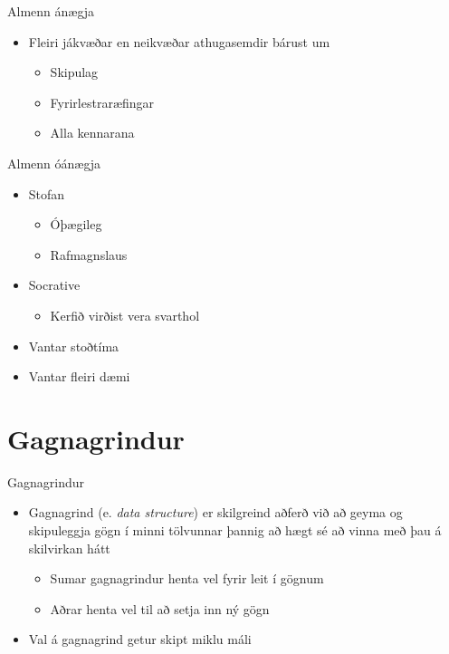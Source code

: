 \documentclass[handout]{beamer}
\begin{document}
\begin{frame}{Almenn ánægja}
\begin{itemize}
 \item Fleiri jákvæðar en neikvæðar athugasemdir bárust um
 \begin{itemize}[<+->]
  \item Skipulag
  \item Fyrirlestraræfingar
  \item Alla kennarana
 \end{itemize}
\end{itemize}
\end{frame}

\begin{frame}{Almenn óánægja}
\begin{itemize}
 \item Stofan
 \begin{itemize}
  \item Óþægileg
  \item Rafmagnslaus \pause
 \end{itemize}
 \item Socrative
 \begin{itemize}
  \item Kerfið virðist vera svarthol \pause
 \end{itemize}
 \item Vantar stoðtíma \pause 
 \item Vantar fleiri dæmi
\end{itemize}
\end{frame}

\section{Gagnagrindur}

\begin{frame}{Gagnagrindur}
\begin{itemize}
 \item Gagnagrind (e. \emph{data structure}) er skilgreind aðferð við að geyma og skipuleggja gögn í minni tölvunnar þannig að hægt sé að vinna með þau á skilvirkan hátt
 \begin{itemize}
  \item Sumar gagnagrindur henta vel fyrir leit í gögnum
  \item Aðrar henta vel til að setja inn ný gögn
 \end{itemize}
 \item Val á gagnagrind getur skipt miklu máli
\end{itemize}
\end{frame}
\end{document}
